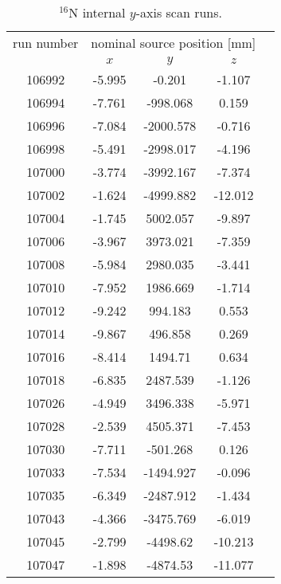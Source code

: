 \begin{table}[ht]
		\caption[$^{16}$N internal $y$-axis scan runs.]{$^{16}$N internal $y$-axis scan runs.\label{table:n16scanTable_yscan}}
				\vspace{2mm}
				\centering
	\begin{tabular*}{90mm}{c@{\extracolsep{\fill}}*4c}
		\toprule 
		run number  & \multicolumn{3}{c}{nominal source position [mm]}  \\
		\cline{2-4}
		& $x$ & $y$ & $z$\\
		\midrule        
        106992 & -5.995 & -0.201 & -1.107\\
        106994 & -7.761 & -998.068 & 0.159\\
        106996 & -7.084 & -2000.578 & -0.716\\
        106998 & -5.491 & -2998.017 & -4.196\\
        107000 & -3.774 & -3992.167 & -7.374\\
        107002 & -1.624 & -4999.882 & -12.012\\
        107004 & -1.745 & 5002.057 & -9.897\\
        107006 & -3.967 & 3973.021 & -7.359\\
        107008 & -5.984 & 2980.035 & -3.441\\
        107010 & -7.952 & 1986.669 & -1.714\\
        107012 & -9.242 & 994.183 & 0.553\\
        107014 & -9.867 & 496.858 & 0.269\\
        107016 & -8.414 & 1494.71 & 0.634\\
        107018 & -6.835 & 2487.539 & -1.126\\
        107026 & -4.949 & 3496.338 & -5.971\\
        107028 & -2.539 & 4505.371 & -7.453\\
        107030 & -7.711 & -501.268 & 0.126\\
        107033 & -7.534 & -1494.927 & -0.096\\
        107035 & -6.349 & -2487.912 & -1.434\\
        107043 & -4.366 & -3475.769 & -6.019\\
        107045 & -2.799 & -4498.62 & -10.213\\
        107047 & -1.898 & -4874.53 & -11.077\\
        		\bottomrule	
       	\end{tabular*}
   \end{table} 

